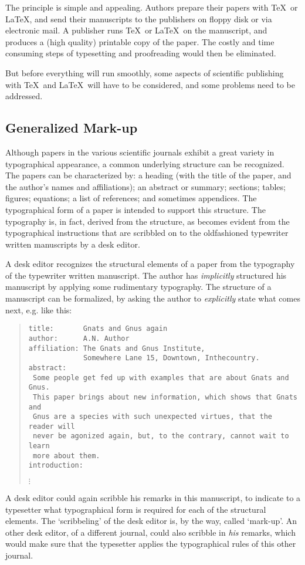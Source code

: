 The principle is simple and appealing.
Authors prepare their papers with \TeX\ or \LaTeX, and send their manuscripts
to the publishers on floppy disk or via electronic mail.
A publisher runs \TeX\ or \LaTeX\ on the manuscript, and produces a
(high quality) printable copy of the paper.
The costly and time consuming steps of typesetting and proofreading
would then be eliminated.

But before everything will run smoothly, some aspects of scientific publishing
with \TeX\ and \LaTeX\ will have to be considered, and some problems need to
be addressed.

\subsection{Generalized Mark-up}

Although papers in the various scientific journals exhibit a great variety
in typographical appearance, a common underlying structure can be recognized.
The papers can be characterized by: a heading (with the title of the paper,
and the author's names and affiliations); an abstract or summary; sections;
tables; figures; equations; a list of references; and sometimes appendices.
The typographical form of a paper is intended to support this structure.
The typography is, in fact, derived from the structure, as becomes evident
from the typographical instructions that are scribbled on to the oldfashioned
typewriter written manuscripts by a desk editor.

A desk editor recognizes the structural elements of a paper from the
typography of the typewriter written manuscript.
The author has {\sl implicitly\/} structured his manuscript by applying
some rudimentary typography.
The structure of a manuscript can be formalized, by asking the author to
{\sl explicitly\/} state what comes next, e.g. like this:
%
\begin{quotation}
\noindent\begin{verbatim}
title:       Gnats and Gnus again
author:      A.N. Author
affiliation: The Gnats and Gnus Institute,
             Somewhere Lane 15, Downtown, Inthecountry.
abstract:
 Some people get fed up with examples that are about Gnats and Gnus.
 This paper brings about new information, which shows that Gnats and
 Gnus are a species with such unexpected virtues, that the reader will
 never be agonized again, but, to the contrary, cannot wait to learn
 more about them.
introduction:
\end{verbatim}
\par$\vdots$
\end{quotation}
%
A desk editor could again scribble his remarks in this manuscript,
to indicate to a typesetter what typographical form is required for
each of the structural elements.
The `scribbeling' of the desk editor is, by the way, called `mark-up'.
An other desk editor, of a different journal, could also scribble
in {\sl his\/} remarks, which would make sure that the typesetter
applies the typographical rules of this other journal.

